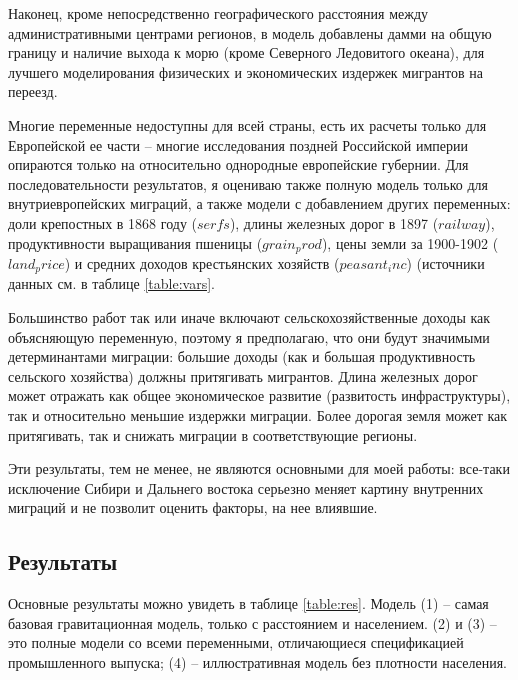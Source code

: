 \documentclass[a4paper,12pt]{article}
\begin{document}
Наконец, кроме непосредственно географического расстояния между административными центрами регионов, в модель добавлены дамми на общую границу и наличие выхода к морю (кроме Северного Ледовитого океана), для лучшего моделирования физических и экономических издержек мигрантов на переезд. 

Многие переменные недоступны для всей страны, есть их расчеты только для Европейской ее части -- многие исследования поздней Российской империи опираются только на относительно однородные европейские губернии. Для последовательности результатов, я оцениваю также полную модель только для внутриевропейских миграций, а также модели с добавлением других переменных: доли крепостных в 1868 году ($serfs$), длины железных дорог в 1897 ($railway$), продуктивности выращивания пшеницы (${grain_prod}$), цены земли за 1900-1902 (${land_price}$) и средних доходов крестьянских хозяйств (${peasant_inc}$) (источники данных см. в таблице \ref{table:vars}.

Большинство работ так или иначе включают сельскохозяйственные доходы как объясняющую переменную, поэтому я предполагаю, что они будут значимыми детерминантами миграции: большие доходы (как и большая продуктивность сельского хозяйства) должны притягивать мигрантов. Длина железных дорог может отражать как общее экономическое развитие (развитость инфраструктуры), так и относительно меньшие издержки миграции. Более дорогая земля может как притягивать, так и снижать миграции в соответствующие регионы. 

Эти результаты, тем не менее, не являются основными для моей работы: все-таки исключение Сибири и Дальнего востока серьезно меняет картину внутренних миграций и не позволит оценить факторы, на нее влиявшие.

\subsection{Результаты}


Основные результаты можно увидеть в таблице \ref{table:res}. Модель (1) -- самая базовая гравитационная модель, только с расстоянием и населением. (2) и (3) -- это полные модели со всеми переменными, отличающиеся спецификацией промышленного выпуска; (4) -- иллюстративная модель без плотности населения.
\end{document}
